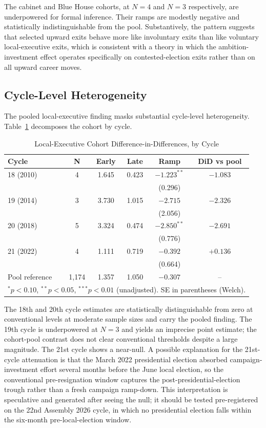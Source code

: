 \documentclass[11pt]{article}
\begin{document}
The cabinet and Blue House cohorts, at $N=4$ and $N=3$ respectively, are underpowered for formal inference. Their ramps are modestly negative and statistically indistinguishable from the pool. Substantively, the pattern suggests that selected upward exits behave more like involuntary exits than like voluntary local-executive exits, which is consistent with a theory in which the ambition-investment effect operates specifically on contested-election exits rather than on all upward career moves.

\subsection{Cycle-Level Heterogeneity}

The pooled local-executive finding masks substantial cycle-level heterogeneity. Table~\ref{tab:cycle} decomposes the cohort by cycle.

\begin{table}[H]
\centering
\caption{Local-Executive Cohort Difference-in-Differences, by Cycle}
\label{tab:cycle}
\begin{tabular}{lccccc}
\toprule
Cycle & N & Early & Late & Ramp & DiD vs pool \\
\midrule
18 (2010) & 4 & 1.645 & 0.423 & $-1.223^{**}$ & $-1.083$ \\
 & & & & (0.296) & \\
19 (2014) & 3 & 3.730 & 1.015 & $-2.715$ & $-2.326$ \\
 & & & & (2.056) & \\
20 (2018) & 5 & 3.324 & 0.474 & $-2.850^{**}$ & $-2.691$ \\
 & & & & (0.776) & \\
21 (2022) & 4 & 1.111 & 0.719 & $-0.392$ & $+0.136$ \\
 & & & & (0.664) & \\
\midrule
Pool reference & 1{,}174 & 1.357 & 1.050 & $-0.307$ & -- \\
\bottomrule
\multicolumn{6}{l}{\footnotesize $^*p<0.10$, $^{**}p<0.05$, $^{***}p<0.01$ (unadjusted). SE in parentheses (Welch).}
\end{tabular}
\end{table}

The 18th and 20th cycle estimates are statistically distinguishable from zero at conventional levels at moderate sample sizes and carry the pooled finding. The 19th cycle is underpowered at $N=3$ and yields an imprecise point estimate; the cohort-pool contrast does not clear conventional thresholds despite a large magnitude. The 21st cycle shows a near-null. A possible explanation for the 21st-cycle attenuation is that the March 2022 presidential election absorbed campaign-investment effort several months before the June local election, so the conventional pre-resignation window captures the post-presidential-election trough rather than a fresh campaign ramp-down. This interpretation is speculative and generated after seeing the null; it should be tested pre-registered on the 22nd Assembly 2026 cycle, in which no presidential election falls within the six-month pre-local-election window.
\end{document}
